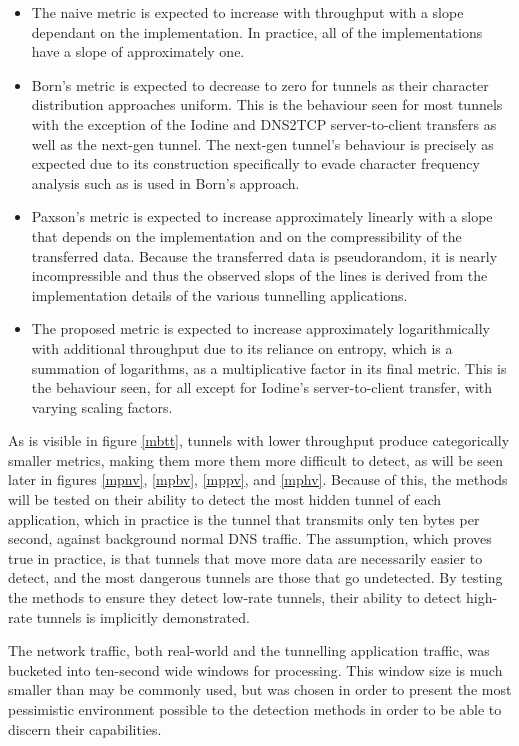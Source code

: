 \documentclass[12pt]{report}
\theoremstyle{remark}
\theoremstyle{definition}
\theoremstyle{definition}
\theoremstyle{definition}
\begin{document}
\begin{itemize}
\item The naive metric is expected to increase with throughput with a slope
dependant on the implementation. In practice, all of the implementations have a
slope of approximately one.

\item Born's metric is expected to decrease to zero for tunnels as their
character distribution approaches uniform. This is the behaviour seen for most
tunnels with the exception of the Iodine and DNS2TCP server-to-client transfers
as well as the next-gen tunnel. The next-gen tunnel's behaviour is precisely as
expected due to its construction specifically to evade character frequency
analysis such as is used in Born's approach.

\item Paxson's metric is expected to increase approximately linearly with a
slope that depends on the implementation and on the compressibility of the
transferred data. Because the transferred data is pseudorandom, it is nearly
incompressible and thus the observed slops of the lines is derived from the
implementation details of the various tunnelling applications.

\item The proposed metric is expected to increase approximately logarithmically
with additional throughput due to its reliance on entropy, which is a summation
of logarithms, as a multiplicative factor in its final metric. This is the
behaviour seen, for all except for Iodine's server-to-client transfer, with
varying scaling factors.
\end{itemize}

As is visible in figure \ref{mbtt}, tunnels with lower throughput produce
categorically smaller metrics, making them more them more difficult to detect,
as will be seen later in figures \ref{mpnv}, \ref{mpbv}, \ref{mppv}, and
\ref{mphv}. Because of this, the methods will be tested on their ability to
detect the most hidden tunnel of each application, which in practice is the
tunnel that transmits only ten bytes per second, against background normal DNS
traffic. The assumption, which proves true in practice, is that tunnels that
move more data are necessarily easier to detect, and the most dangerous tunnels
are those that go undetected. By testing the methods to ensure they detect
low-rate tunnels, their ability to detect high-rate tunnels is implicitly
demonstrated.

The network traffic, both real-world and the tunnelling application traffic, was
bucketed into ten-second wide windows for processing. This window size is much
smaller than may be commonly used, but was chosen in order to present the most
pessimistic environment possible to the detection methods in order to be able to
discern their capabilities.
\end{document}
